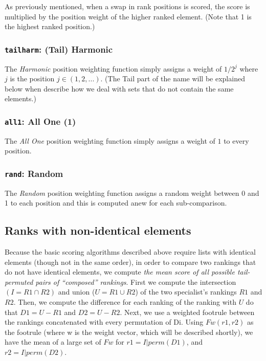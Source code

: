 \documentclass{article}
\begin{document}
As previously mentioned, when a swap in rank positions is scored, the score is multiplied by the position weight of the higher ranked element. (Note that 1 is the highest ranked position.) 

\subsubsection{\texttt{tailharm}: (Tail) Harmonic}

The \emph{Harmonic} position weighting function simply assigns a weight of $1/{2^j}$ where $j$ is the position $j\in (1, 2, ...)$. (The Tail part of the name will be explained below when describe how we deal with sets that do not contain the same elements.)

\subsubsection{\texttt{all1}: All One (1)}

The \emph{All One} position weighting function simply assigns a weight of $1$ to every position. 

\subsubsection{\texttt{rand}: Random}

The \emph{Random} position weighting function assigns a random weight between 0 and 1 to each position and this is computed anew for each sub-comparison. 

\subsection{Ranks with non-identical elements}

Because the basic scoring algorithms described above require lists with identical elements (though not in the same order), in order to compare two rankings that do not have identical elements, we compute \textit{the mean score of all possible tail-permuted pairs of ``composed'' rankings}.  First we compute the intersection $(I=R1 \cap R2)$ and union ($U = R1 \cup R2$) of the two specialist's rankings $R1$ and $R2$. Then, we compute the difference for each ranking of the ranking with $U$ do that $D1=U-R1$ and $D2=U-R2$. Next, we use a weighted footrule between the rankings concatenated with every permutation of Di. Using $Fw(r1,r2)$ as the footrule (where w is the weight vector, which will be described shortly), we have the mean of a large set of $Fw$ for $r1 = I|perm(D1)$, and $r2=I|perm(D2)$.
\end{document}
